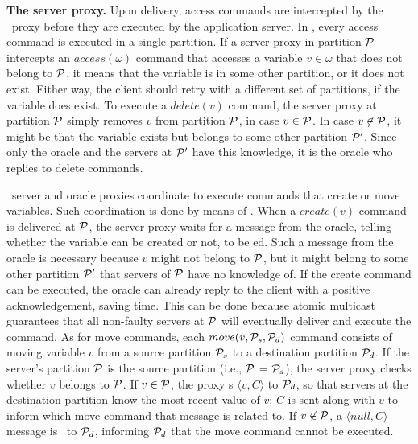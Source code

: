 

\textbf{The server proxy.} Upon delivery, access commands are intercepted by the
\dssmr\ proxy before they are executed by the application server. In \dssmr{},
every access command is executed in a single partition. If a server proxy in
partition $\mathcal{P}$ intercepts an $access(\omega)$ command that accesses a variable
$v \in \omega$ that does not belong to $\mathcal{P}$, it means that the variable is in
some other partition, or it does not exist. Either way, the client should retry
with a different set of partitions, if the variable does exist. To execute a
$delete(v)$ command, the server proxy at partition $\mathcal{P}$ simply removes $v$
from partition $\mathcal{P}$, in case $v \in \mathcal{P}$. In case $v \not\in \mathcal{P}$, it might
be that the variable exists but belongs to some other partition $\mathcal{P}'$. Since
only the oracle and the servers at $\mathcal{P}'$ have this knowledge, it is the oracle
who replies to delete commands.

\dssmr\ server and oracle proxies coordinate to execute commands that create or
move variables. Such coordination is done by means of \rmcast{}. When a
$create(v)$ command is delivered at $\mathcal{P}$, the server proxy waits for a message
from the oracle, telling whether the variable can be created or not, to be
\rmdel{}ed. Such a message from the oracle is necessary because $v$ might not
belong to $\mathcal{P}$, but it might belong to some other partition $\mathcal{P}'$ that
servers of $\mathcal{P}$ have no knowledge of. If the create command can be executed,
the oracle can already reply to the client with a positive acknowledgement,
saving time. This can be done because atomic multicast guarantees that all
non-faulty servers at $\mathcal{P}$ will eventually deliver and execute the command. As
for move commands, each $move(v,\mathcal{P}_s,\mathcal{P}_d)$ command consists of moving
variable $v$ from a source partition $\mathcal{P}_s$ to a destination partition
$\mathcal{P}_d$. If the server's partition $\mathcal{P}$ is the source partition (i.e., $\mathcal{P}$
= $\mathcal{P}_s$), the server proxy checks whether $v$ belongs to $\mathcal{P}$. If $v \in
\mathcal{P}$, the proxy \rmcast{}s $\langle v, C \rangle$ to $\mathcal{P}_d$, so that servers
at the destination partition know the most recent value of $v$; $C$ is sent
along with $v$ to inform which move command that message is related to. If $v
\not\in \mathcal{P}$, a $\langle null, C \rangle$ message is \rmcast\ to $\mathcal{P}_d$,
informing $\mathcal{P}_d$ that the move command cannot be executed.



